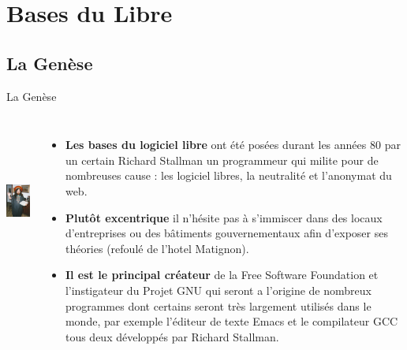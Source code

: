 

\begin{frame}[t,plain]
\titlepage
\end{frame}

\watermarkoff

\section{Bases du Libre}
\subsection{La Genèse}
\begin{frame}[t]{La Genèse}
    \begin{columns}
            \centering
                \includegraphics[height=5cm, width=3.5cm]{saintignucius}
            \begin{itemize}
                \item\fontsize{8}{10.5}\selectfont \textbf{Les bases du logiciel libre} ont été posées durant les années 80 par un certain Richard Stallman un programmeur qui milite pour de nombreuses cause : les logiciel libres, la neutralité et l’anonymat du web. \pause
               \item\fontsize{8}{10.5}\selectfont\textbf{Plutôt excentrique} il n'hésite pas à s’immiscer dans des locaux d’entreprises ou des bâtiments gouvernementaux afin d’exposer ses théories (refoulé de l’hotel Matignon).\pause
               \item\fontsize{8}{10.5}\selectfont\textbf{Il est le principal créateur} de la Free Software Foundation et l’instigateur du Projet GNU qui seront a l’origine de nombreux programmes dont certains seront très largement utilisés dans le monde, par exemple l'éditeur de texte Emacs et le compilateur GCC tous deux développés par Richard Stallman.
            \end{itemize}
    \end{columns}
\end{frame}

